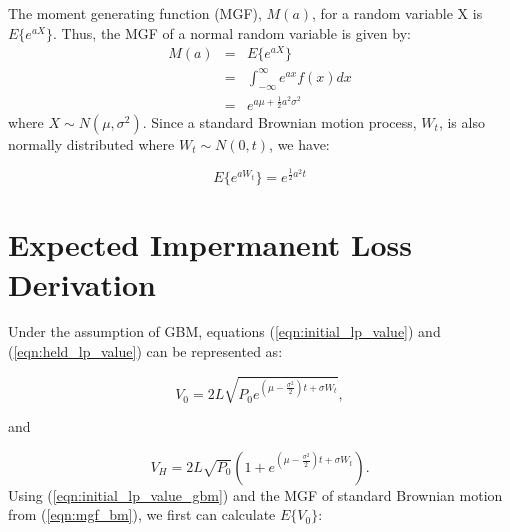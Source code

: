 \documentclass[journal,twocolumn,12pt]{ieeesyscoin}
\begin{document}
The moment generating function (MGF), $M(a)$, for a random variable X is $E\{e^{aX}\}$. Thus, the MGF of a normal random variable is given by:
\begin{eqnarray*}\label{eqn:mgf_normal}
M(a) &=& E\{e^{aX}\}\\ 
           &=& \int_{-\infty}^{\infty}e^{ax}f(x)dx \\
           &=& e^{a\mu + \frac{1}{2}a^2\sigma^2}
\end{eqnarray*}
where $X \sim N(\mu, \sigma^2)$. Since a standard Brownian motion process, $W_{t}$, is also normally distributed where $W_{t} \sim N(0,t)$, we have:

\begin{equation}\label{eqn:mgf_bm}
  E\{e^{aW_{t}}\} = e^{\frac{1}{2}a^2t}
\end{equation}

\section{Expected Impermanent Loss Derivation}
\label{sec:exp_imp_loss_derv}

Under the assumption of GBM, equations (\ref{eqn:initial_lp_value}) and (\ref{eqn:held_lp_value}) can be represented as:

\begin{equation}\label{eqn:initial_lp_value_gbm}
V_{0} = 2L\sqrt{P_{0} e^{(\mu - \frac{\sigma^2}{2})t + \sigma W_{t} } },
\end{equation}

and  

\begin{equation}\label{eqn:held_lp_value_gbm}
V_{H} = 2L\sqrt{P_{0}} ( 1 + e^{(\mu - \frac{\sigma^2}{2})t + \sigma W_{t} } ).
\end{equation}
Using (\ref{eqn:initial_lp_value_gbm}) and the MGF of standard Brownian motion from (\ref{eqn:mgf_bm}), we first can calculate $E\{V_{0}\}$:
\end{document}
